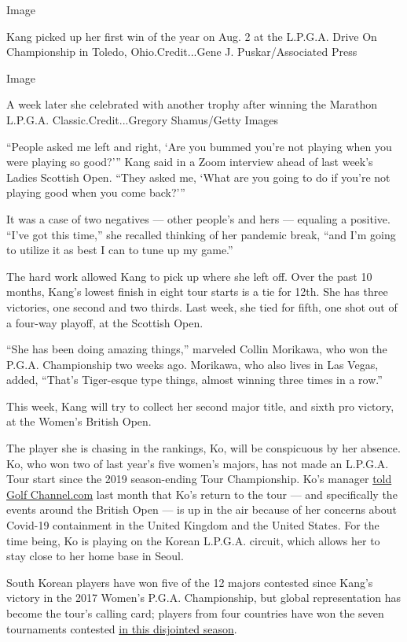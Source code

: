 Image

Kang picked up her first win of the year on Aug. 2 at the L.P.G.A. Drive
On Championship in Toledo, Ohio.Credit...Gene J. Puskar/Associated Press

Image

A week later she celebrated with another trophy after winning the
Marathon L.P.G.A. Classic.Credit...Gregory Shamus/Getty Images

``People asked me left and right, `Are you bummed you're not playing
when you were playing so good?''' Kang said in a Zoom interview ahead of
last week's Ladies Scottish Open. ``They asked me, `What are you going
to do if you're not playing good when you come back?'''

It was a case of two negatives --- other people's and hers --- equaling
a positive. ``I've got this time,'' she recalled thinking of her
pandemic break, ``and I'm going to utilize it as best I can to tune up
my game.''

The hard work allowed Kang to pick up where she left off. Over the past
10 months, Kang's lowest finish in eight tour starts is a tie for 12th.
She has three victories, one second and two thirds. Last week, she tied
for fifth, one shot out of a four-way playoff, at the Scottish Open.

``She has been doing amazing things,'' marveled Collin Morikawa, who won
the P.G.A. Championship two weeks ago. Morikawa, who also lives in Las
Vegas, added, ``That's Tiger-esque type things, almost winning three
times in a row.''

This week, Kang will try to collect her second major title, and sixth
pro victory, at the Women's British Open.

The player she is chasing in the rankings, Ko, will be conspicuous by
her absence. Ko, who won two of last year's five women's majors, has not
made an L.P.G.A. Tour start since the 2019 season-ending Tour
Championship. Ko's manager
\href{https://www.golfchannel.com/news/world-nos-1-and-3-staying-sideline-even-major-lpga-returns}{told
Golf Channel.com} last month that Ko's return to the tour --- and
specifically the events around the British Open --- is up in the air
because of her concerns about Covid-19 containment in the United Kingdom
and the United States. For the time being, Ko is playing on the Korean
L.P.G.A. circuit, which allows her to stay close to her home base in
Seoul.

South Korean players have won five of the 12 majors contested since
Kang's victory in the 2017 Women's P.G.A. Championship, but global
representation has become the tour's calling card; players from four
countries have won the seven tournaments contested
\href{https://www.nytimes3xbfgragh.onion/2020/04/29/sports/golf/coronavirus-lpga-tour-golf.html}{in
this disjointed season}.


